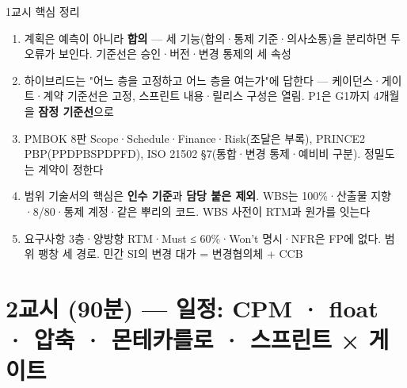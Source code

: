 \begin{frame}{1교시 핵심 정리}
\begin{enumerate}
\item 계획은 예측이 아니라 \textbf{합의} — 세 기능(합의·통제 기준·의사소통)을 분리하면 두 오류가 보인다. 기준선은 승인·버전·변경 통제의 세 속성
\item 하이브리드는 "어느 층을 고정하고 어느 층을 여는가"에 답한다 — 케이던스·게이트·계약 기준선은 고정, 스프린트 내용·릴리스 구성은 열림. P1은 G1까지 4개월을 \textbf{잠정 기준선}으로
\item PMBOK 8판 Scope·Schedule·Finance·Risk(조달은 부록), PRINCE2 PBP(PPD\ra{}PBS\ra{}PD\ra{}PFD), ISO 21502 §7(통합·변경 통제·예비비 구분). 정밀도는 계약이 정한다
\item 범위 기술서의 핵심은 \textbf{인수 기준}과 \textbf{담당 붙은 제외}. WBS는 100\%·산출물 지향·8/80·통제 계정·같은 뿌리의 코드. WBS 사전이 RTM과 원가를 잇는다
\item 요구사항 3층·양방향 RTM·Must ≤ 60\%·Won't 명시·NFR은 FP에 없다. 범위 팽창 세 경로. 민간 SI의 변경 대가 = 변경협의체 + CCB
\end{enumerate}
\end{frame}

\section{2교시 (90분) — 일정: CPM · float · 압축 · 몬테카를로 · 스프린트 × 게이트}

